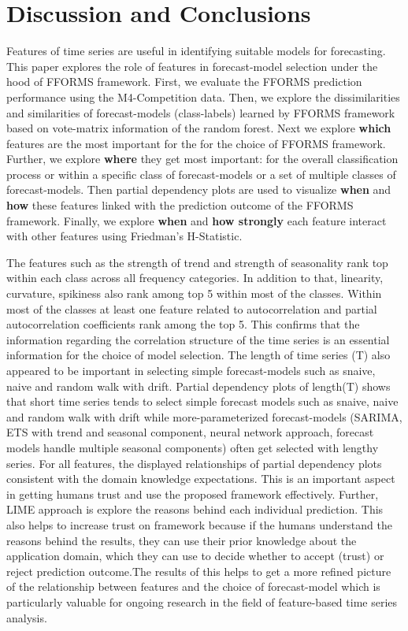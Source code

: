 \documentclass[11pt,a4paper,]{article}
\begin{document}
\hypertarget{conclusions}{%
\section{Discussion and Conclusions}\label{conclusions}}

Features of time series are useful in identifying suitable models for forecasting. This paper explores the role of features in forecast-model selection under the hood of FFORMS framework. First, we evaluate the FFORMS prediction performance using the M4-Competition data. Then, we explore the dissimilarities and similarities of forecast-models (class-labels) learned by FFORMS framework based on vote-matrix information of the random forest. Next we explore \textbf{which} features are the most important for the for the choice of FFORMS framework. Further, we explore \textbf{where} they get most important: for the overall classification process or within a specific class of forecast-models or a set of multiple classes of forecast-models. Then partial dependency plots are used to visualize \textbf{when} and \textbf{how} these features linked with the prediction outcome of the FFORMS framework. Finally, we explore \textbf{when} and \textbf{how strongly} each feature interact with other features using Friedman's H-Statistic.

The features such as the strength of trend and strength of seasonality rank top within each class across all frequency categories. In addition to that, linearity, curvature, spikiness also rank among top 5 within most of the classes. Within most of the classes at least one feature related to autocorrelation and partial autocorrelation coefficients rank among the top 5. This confirms that the information regarding the correlation structure of the time series is an essential information for the choice of model selection. The length of time series (T) also appeared to be important in selecting simple forecast-models such as snaive, naive and random walk with drift. Partial dependency plots of length(T) shows that short time series tends to select simple forecast models such as snaive, naive and random walk with drift while more-parameterized forecast-models (SARIMA, ETS with trend and seasonal component, neural network approach, forecast models handle multiple seasonal components) often get selected with lengthy series. For all features, the displayed relationships of partial dependency plots consistent with the domain knowledge expectations. This is an important aspect in getting humans trust and use the proposed framework effectively. Further, LIME approach is explore the reasons behind each individual prediction. This also helps to increase trust on framework because if the humans understand the reasons behind the results, they can use their prior knowledge about the application domain, which they can use to decide whether to accept (trust) or reject prediction outcome.The results of this helps to get a more refined picture of the relationship between features and the choice of forecast-model which is particularly valuable for ongoing research in the field of feature-based time series analysis.
\end{document}
